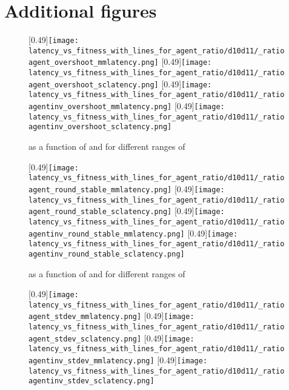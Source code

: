 \section{Additional figures}

 \begin{figure}
 	\centering
 	\subcaptionbox{\overshoot}[0.49\linewidth]{\texttt{[image: latency\_vs\_fitness\_with\_lines\_for\_agent\_ratio/d10d11/\_ratioagent\_overshoot\_mmlatency.png]}}
 	\subcaptionbox{\overshoot}[0.49\linewidth]{\texttt{[image: latency\_vs\_fitness\_with\_lines\_for\_agent\_ratio/d10d11/\_ratioagent\_overshoot\_sclatency.png]}}
 	\subcaptionbox{\overshoot}[0.49\linewidth]{\texttt{[image: latency\_vs\_fitness\_with\_lines\_for\_agent\_ratio/d10d11/\_ratioagentinv\_overshoot\_mmlatency.png]}}
 	\subcaptionbox{\overshoot}[0.49\linewidth]{\texttt{[image: latency\_vs\_fitness\_with\_lines\_for\_agent\_ratio/d10d11/\_ratioagentinv\_overshoot\_sclatency.png]}}
	\caption{\overshoot{} as a function of \ssmmnAgents{} and \ssmmlatencymu{} for different ranges of \ratioagents}
 \end{figure}
 
  \begin{figure}
  	\centering
  	\subcaptionbox{\overshoot}[0.49\linewidth]{\texttt{[image: latency\_vs\_fitness\_with\_lines\_for\_agent\_ratio/d10d11/\_ratioagent\_round\_stable\_mmlatency.png]}}
  	\subcaptionbox{\overshoot}[0.49\linewidth]{\texttt{[image: latency\_vs\_fitness\_with\_lines\_for\_agent\_ratio/d10d11/\_ratioagent\_round\_stable\_sclatency.png]}}
  	\subcaptionbox{\overshoot}[0.49\linewidth]{\texttt{[image: latency\_vs\_fitness\_with\_lines\_for\_agent\_ratio/d10d11/\_ratioagentinv\_round\_stable\_mmlatency.png]}}
  	\subcaptionbox{\overshoot}[0.49\linewidth]{\texttt{[image: latency\_vs\_fitness\_with\_lines\_for\_agent\_ratio/d10d11/\_ratioagentinv\_round\_stable\_sclatency.png]}}
 	\caption{\roundstable{} as a function of \ssmmnAgents{} and \ssmmlatencymu{} for different ranges of \ratioagents}
  \end{figure}
  
  
  \begin{figure}
  	\centering
  	\subcaptionbox{\overshoot}[0.49\linewidth]{\texttt{[image: latency\_vs\_fitness\_with\_lines\_for\_agent\_ratio/d10d11/\_ratioagent\_stdev\_mmlatency.png]}}
  	\subcaptionbox{\overshoot}[0.49\linewidth]{\texttt{[image: latency\_vs\_fitness\_with\_lines\_for\_agent\_ratio/d10d11/\_ratioagent\_stdev\_sclatency.png]}}
  	\subcaptionbox{\overshoot}[0.49\linewidth]{\texttt{[image: latency\_vs\_fitness\_with\_lines\_for\_agent\_ratio/d10d11/\_ratioagentinv\_stdev\_mmlatency.png]}}
  	\subcaptionbox{\overshoot}[0.49\linewidth]{\texttt{[image: latency\_vs\_fitness\_with\_lines\_for\_agent\_ratio/d10d11/\_ratioagentinv\_stdev\_sclatency.png]}}
 	\caption{}
  \end{figure}
  
